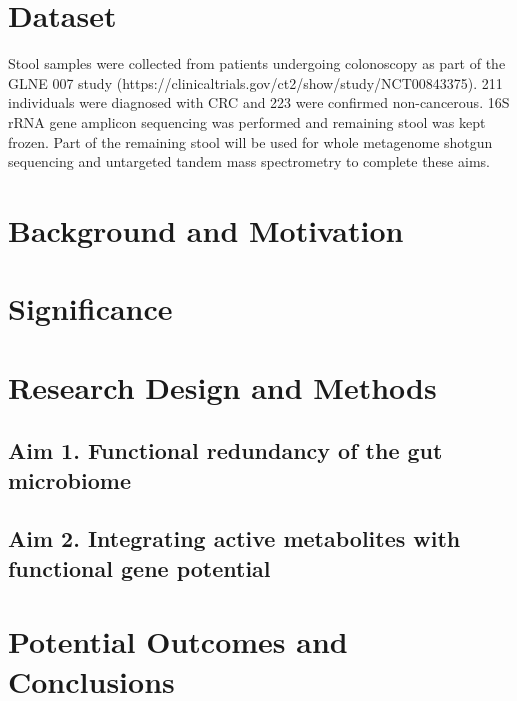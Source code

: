 \documentclass[11pt]{article}
\begin{document}
\section*{Dataset}
Stool samples were collected from patients undergoing colonoscopy as part of the GLNE 007 study (https://clinicaltrials.gov/ct2/show/study/NCT00843375).
211 individuals were diagnosed with CRC and 223 were confirmed non-cancerous.
16S rRNA gene amplicon sequencing was performed and remaining stool was kept frozen.
Part of the remaining stool will be used for whole metagenome shotgun sequencing and untargeted tandem mass spectrometry to complete these aims.


\section*{Background and Motivation} %

\section*{Significance} %

\section*{Research Design and Methods}

\subsection*{Aim 1. Functional redundancy of the gut microbiome}


\subsection*{Aim 2. Integrating active metabolites with functional gene potential}


\section*{Potential Outcomes and Conclusions}


\pagebreak

\section*{\refname}
\footnotesize{

\par}
\end{document}
